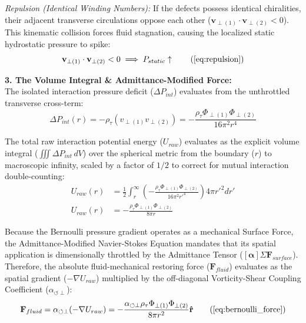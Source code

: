 \documentclass[11pt, a4paper]{article}
\begin{document}
\textit{Repulsion (Identical Winding Numbers):} If the defects possess identical chiralities, their adjacent transverse circulations oppose each other ($\mathbf{v}_{\perp(1)} \cdot \mathbf{v}_{\perp(2)} < 0$). This kinematic collision forces fluid stagnation, causing the localized static hydrostatic pressure to spike:
\begin{equation}
    \mathbf{v}_{\perp(1)} \cdot \mathbf{v}_{\perp(2)} < 0 \implies P_{static} \uparrow \tag{\ref{eq:repulsion}}
\end{equation}

\textbf{3. The Volume Integral \& Admittance-Modified Force:} \\
The isolated interaction pressure deficit ($\Delta P_{int}$) evaluates from the unthrottled transverse cross-term:
\begin{equation}
    \Delta P_{int}(r) = - \rho_{\tau} (v_{\perp(1)} v_{\perp(2)}) = - \frac{\rho_{\tau} \Phi_{\perp(1)} \Phi_{\perp(2)}}{16\pi^2 r^4}
\end{equation}

The total raw interaction potential energy ($U_{raw}$) evaluates as the explicit volume integral ($\iiint \Delta P_{int} \, dV$) over the spherical metric from the boundary ($r$) to macroscopic infinity, scaled by a factor of $1/2$ to correct for mutual interaction double-counting:
\begin{align}
    U_{raw}(r) &= \frac{1}{2} \int_{r}^{\infty} \left( - \frac{\rho_{\tau} \Phi_{\perp(1)} \Phi_{\perp(2)}}{16\pi^2 r'^4} \right) 4\pi r'^2 dr'  \\
    U_{raw}(r) &= - \frac{\rho_{\tau} \Phi_{\perp(1)} \Phi_{\perp(2)}}{8\pi r}
\end{align}

Because the Bernoulli pressure gradient operates as a mechanical Surface Force, the Admittance-Modified Navier-Stokes Equation mandates that its spatial application is dimensionally throttled by the Admittance Tensor ($[\boldsymbol{\alpha}] \Sigma \mathbf{F}_{surface}$). Therefore, the absolute fluid-mechanical restoring force ($\mathbf{F}_{fluid}$) evaluates as the spatial gradient ($-\nabla U_{raw}$) multiplied by the off-diagonal Vorticity-Shear Coupling Coefficient ($\alpha_{\circlearrowleft \perp}$):
\begin{equation}
    \mathbf{F}_{fluid} = \alpha_{\circlearrowleft \perp} (-\nabla U_{raw}) = - \frac{\alpha_{\circlearrowleft \perp} \rho_{\tau} \Phi_{\perp(1)} \Phi_{\perp(2)}}{8\pi r^2} \mathbf{\hat{r}} \tag{\ref{eq:bernoulli_force}}
\end{equation}
\end{document}
